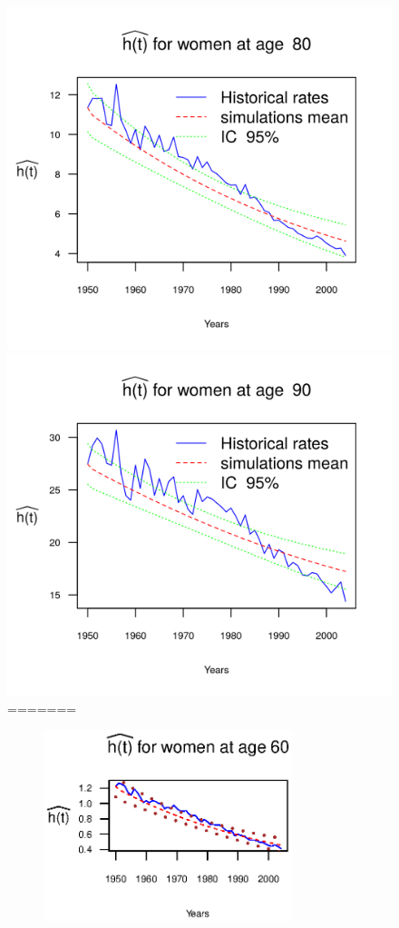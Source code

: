 \documentclass[smallextended]{svjour3}
\begin{document}
\begin{figure}[H]
    \includegraphics{PlotWomen80.png}
    \includegraphics{PlotWomen90.png}
=======
\begin{figure}[htb]
    \includegraphics[width = 2.85in]{PlotWomen60.eps}

\end{figure}
\end{figure}
\end{document}
